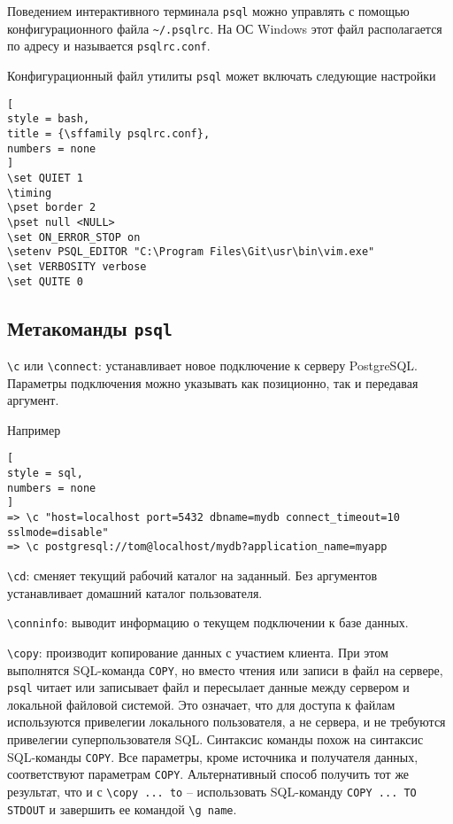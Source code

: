 \documentclass[%
	11pt,
	a4paper,
	utf8,
		]{article}
\begin{document}
Поведением интерактивного терминала \texttt{psql} можно управлять с помощью конфигурационного файла \verb|~/.psqlrc|. На ОС Windows этот файл располагается по адресу  и называется \verb|psqlrc.conf|.

Конфигурационный файл утилиты \texttt{psql} может включать следующие настройки
\begin{lstlisting}[
style = bash,
title = {\sffamily psqlrc.conf},
numbers = none
]
\set QUIET 1
\timing
\pset border 2
\pset null <NULL>
\set ON_ERROR_STOP on
\setenv PSQL_EDITOR "C:\Program Files\Git\usr\bin\vim.exe"
\set VERBOSITY verbose
\set QUITE 0
\end{lstlisting}

\subsection{Метакоманды \texttt{psql}}

\noindent \verb|\c| или \verb|\connect|: устанавливает новое подключение к серверу PostgreSQL. Параметры подключения можно указывать как позиционно, так и передавая аргумент.

Например
\begin{lstlisting}[
style = sql,
numbers = none
]
=> \c "host=localhost port=5432 dbname=mydb connect_timeout=10 sslmode=disable"
=> \c postgresql://tom@localhost/mydb?application_name=myapp
\end{lstlisting}

\noindent \verb|\cd|: сменяет текущий рабочий каталог на заданный. Без аргументов устанавливает домашний каталог пользователя.

\noindent \verb|\conninfo|: выводит информацию о текущем подключении к базе данных.

\noindent \verb|\copy|: производит копирование данных с участием клиента. При этом выполнятся SQL-команда \texttt{COPY}, но вместо чтения или записи в файл на сервере, \texttt{psql} читает или записывает файл и пересылает данные между сервером и локальной файловой системой. Это означает, что для доступа к файлам используются привелегии локального пользователя, а не сервера, и не требуются привелегии суперпользователя SQL. Синтаксис команды похож на синтаксис SQL-команды \texttt{COPY}. Все параметры, кроме источника и получателя данных, соответствуют параметрам \texttt{COPY}. Альтернативный способ получить тот же результат, что и с \verb|\copy ... to| -- использовать SQL-команду \texttt{COPY ... TO STDOUT} и завершить ее командой \verb|\g name|.
\end{document}
